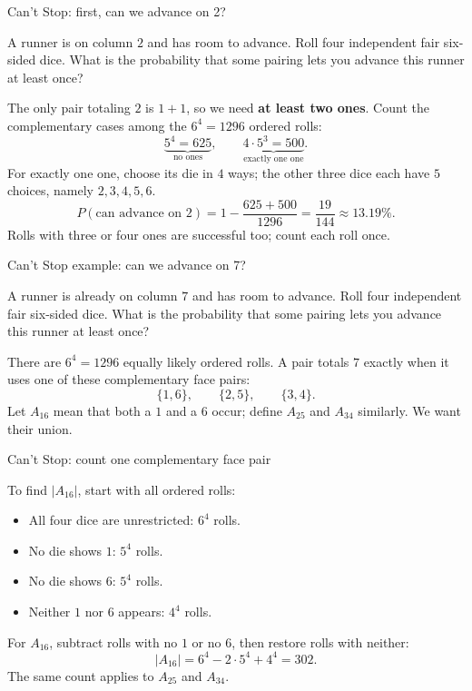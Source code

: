 \begin{frame}[t]{Can't Stop: first, can we advance on 2?}
\small
\begin{ex}
A runner is on column $2$ and has room to advance.
Roll four independent fair six-sided dice. What is the probability
that some pairing lets you advance this runner at least once?
\end{ex}
\begin{sol}
The only pair totaling $2$ is $1+1$, so we need \textbf{at least two ones}.
Count the complementary cases among the $6^4=1296$ ordered rolls:
\[
\underbrace{5^4=625}_{\text{no ones}},\qquad
\underbrace{4\cdot5^3=500}_{\text{exactly one one}}.
\]
For exactly one one, choose its die in $4$ ways; the other three dice
each have $5$ choices, namely $2,3,4,5,6$.
\[
P(\text{can advance on }2)
=1-\frac{625+500}{1296}
=\boxed{\frac{19}{144}\approx13.19\%}.
\]
Rolls with three or four ones are successful too; count each roll once.
\end{sol}
\end{frame}

\begin{frame}[t]{Can't Stop example: can we advance on 7?}
\small
\begin{ex}
A runner is already on column $7$ and has room to advance.
Roll four independent fair six-sided dice. What is the probability
that some pairing lets you advance this runner at least once?
\end{ex}
\begin{sol}
There are $6^4=1296$ equally likely ordered rolls. A pair totals $7$
exactly when it uses one of these complementary face pairs:
\[
\{1,6\},\qquad\{2,5\},\qquad\{3,4\}.
\]
Let $A_{16}$ mean that both a $1$ and a $6$ occur; define $A_{25}$
and $A_{34}$ similarly. We want their union.

\end{sol}
\end{frame}

\begin{frame}[t]{Can't Stop: count one complementary face pair}
\small
\begin{sol}
To find $|A_{16}|$, start with all ordered rolls:
\begin{itemize}
\item All four dice are unrestricted: $6^4$ rolls.
\item No die shows $1$: $5^4$ rolls.
\item No die shows $6$: $5^4$ rolls.
\item Neither $1$ nor $6$ appears: $4^4$ rolls.
\end{itemize}
For $A_{16}$, subtract rolls with no $1$ or no $6$, then restore
rolls with neither:
\[
|A_{16}|=6^4-2\cdot5^4+4^4=302.
\]
The same count applies to $A_{25}$ and $A_{34}$.
\end{sol}
\end{frame}

